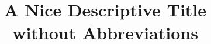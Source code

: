 \newcommand{\metaTitle}{A Nice Descriptive Title\texorpdfstring{\\}{ }without Abbreviations}
\newcommand{\metaTitleShort}{Nice Short Title}
\newcommand{\metaSubject}{Conference Name} 
\newcommand{\metaKeywords}{some, keywords}

\newcommand{\metaAuthorFirst}{F. Last}
\newcommand{\metaMailFirst}{first.last@example.com}
\newcommand{\metaInstFirst}{University, City, Country,\\Department}


\AtBeginDocument{\let\textlabel\label}





    \title{\metaTitle}
    \maketitle

    \begin{abstract}
    
    \end{abstract}

